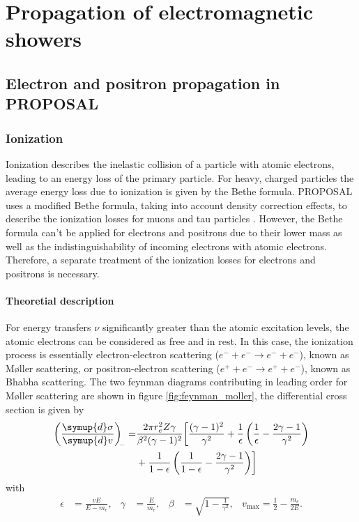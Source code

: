 \chapter{Propagation of electromagnetic showers}

\section{Electron and positron propagation in PROPOSAL}

\subsection{Ionization}

Ionization describes the inelastic collision of a particle with atomic electrons, leading to an energy loss of the primary particle.
For heavy, charged particles the average energy loss due to ionization is given by the Bethe formula.
PROPOSAL uses a modified Bethe formula, taking into account density correction effects, to describe the ionization losses for muons and tau particles \cite{Kohne:2013zbq}.
However, the Bethe formula can't be applied for electrons and positrons due to their lower mass as well as the indistinguishability of incoming electrons with atomic electrons.
Therefore, a separate treatment of the ionization losses for electrons and positrons is necessary.

\subsubsection{Theoretial description}

For energy transfers $\nu$ significantly greater than the atomic excitation levels, the atomic electrons can be considered as free and in rest.
In this case, the ionization process is essentially electron-electron scattering ($e^- + e^- \rightarrow e^- + e^-$), known as M{\o}ller scattering, or positron-electron scattering ($e^+ + e^- \rightarrow e^+ + e^-$), known as Bhabha scattering.
The two feynman diagrams contributing in leading order for M{\o}ller scattering are shown in figure \ref{fig:feynman_moller}, the differential cross section \cite{PhysRev.93.38} is given by
%
\begin{equation}
	\begin{split}
	\label{eqn:moller}
	\left(\frac{\symup{d}\sigma}{\symup{d}v}\right)_{\!\!-} = &\frac{2 \pi r_e^2 Z \gamma}{\beta^2(\gamma - 1)^2} \biggl[ \frac{(\gamma - 1)^2}{\gamma^2} + \frac{1}{\epsilon} \left( \frac{1}{\epsilon} - \frac{2\gamma - 1}{\gamma^2} \right) \\ &+ \frac{1}{1 - \epsilon} \left( \frac{1}{1 - \epsilon} - \frac{2 \gamma - 1}{\gamma^2} \right) \biggr]
	\end{split}
\end{equation}
%
with
%
\begin{align}
	\epsilon &= \frac{v E}{E - m_e},& \gamma &= \frac{E}{m_e}, & \beta &= \sqrt{1 - \frac{1}{\gamma^2}}, & v_{\text{max}} = \frac{1}{2} - \frac{m_e}{2 E}.
\end{align}

